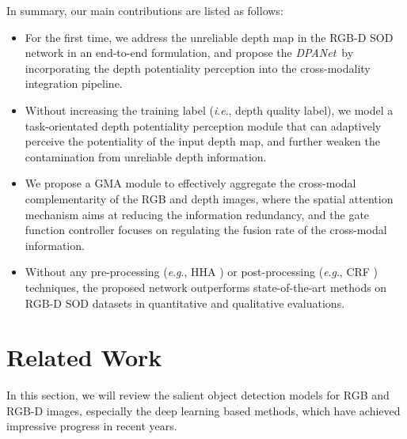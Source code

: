 \documentclass[journal]{IEEEtran}
\def\OURNET{\textit{DPANet}}
\newcommand{\ie}{\textit{i}.\textit{e}.}
\newcommand{\eg}{\textit{e}.\textit{g}.}
\begin{document}
\indent In summary, our main contributions are listed as follows:
\begin{itemize}[noitemsep, topsep=0pt]
	\item For the first time, we address the unreliable depth map in the RGB-D SOD network in an end-to-end formulation, and propose the \OURNET\ by incorporating the depth potentiality perception into the cross-modality integration pipeline.
	\item Without increasing the training label (\ie, depth quality label), we model a task-orientated depth potentiality perception module that can adaptively perceive the potentiality of the input depth map, and further weaken the contamination from unreliable depth information.
	\item We propose a GMA module to effectively aggregate the cross-modal complementarity of the RGB and depth images, where the spatial attention mechanism aims at reducing the information redundancy, and the gate function controller focuses on regulating the fusion rate of the cross-modal information.
	\item Without any pre-processing (\eg, HHA \cite{gupta2014learning}) or post-processing (\eg, CRF \cite{krahenbuhl2011efficient}) techniques, the proposed network outperforms  state-of-the-art methods on  RGB-D SOD datasets in quantitative and qualitative evaluations.
\end{itemize}
\section{Related Work}
In this section, we will review the salient object detection models for RGB and RGB-D images, especially the deep learning based methods, which have achieved impressive progress in recent years. \\
\end{document}
